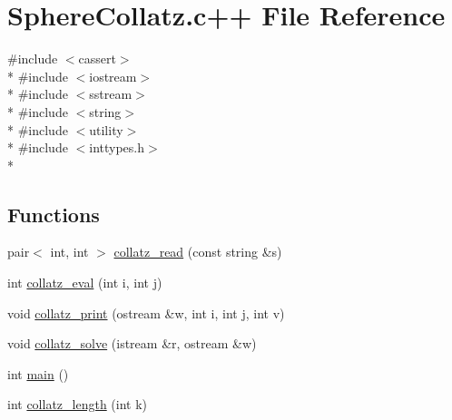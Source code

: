 \hypertarget{SphereCollatz_8c_09_09}{\section{Sphere\-Collatz.\-c++ File Reference}
\label{SphereCollatz_8c_09_09}
}
{\ttfamily \#include $<$cassert$>$}\\*
{\ttfamily \#include $<$iostream$>$}\\*
{\ttfamily \#include $<$sstream$>$}\\*
{\ttfamily \#include $<$string$>$}\\*
{\ttfamily \#include $<$utility$>$}\\*
{\ttfamily \#include $<$inttypes.\-h$>$}\\*
\subsection*{Functions}
\begin{DoxyCompactItemize}
\item 
pair$<$ int, int $>$ \hyperlink{SphereCollatz_8c_09_09_a2772f8a734aeab48332eb3b282f991ba}{collatz\-\_\-read} (const string \&s)
\item 
int \hyperlink{SphereCollatz_8c_09_09_a0b0d3827a619c18aa4d96b8ee8b1c47d}{collatz\-\_\-eval} (int i, int j)
\item 
void \hyperlink{SphereCollatz_8c_09_09_aeda0b7ea3e40e1e7487ccc436f33a559}{collatz\-\_\-print} (ostream \&w, int i, int j, int v)
\item 
void \hyperlink{SphereCollatz_8c_09_09_a0ac646d2122741f9a9a52201bf9551cc}{collatz\-\_\-solve} (istream \&r, ostream \&w)
\item 
int \hyperlink{SphereCollatz_8c_09_09_ae66f6b31b5ad750f1fe042a706a4e3d4}{main} ()
\item 
int \hyperlink{SphereCollatz_8c_09_09_a29fab7b0d712dabd2f21c1b7bf5218a5}{collatz\-\_\-length} (int k)
\end{DoxyCompactItemize}
